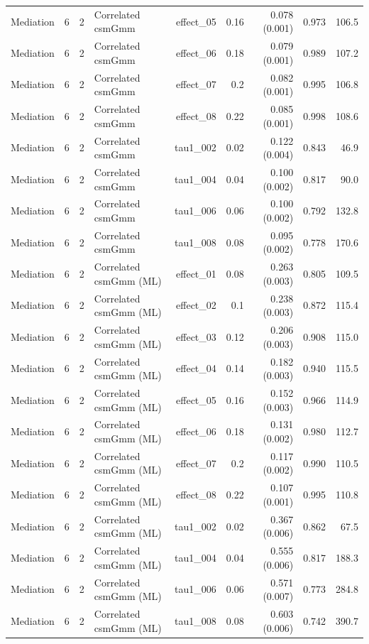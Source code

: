 \begin{longtable}{lcclrrrrr}
Mediation & 6 & 2 & Correlated csmGmm & effect\_05 & 0.16 & 0.078 (0.001) & 0.973 & 106.5\\
Mediation & 6 & 2 & Correlated csmGmm & effect\_06 & 0.18 & 0.079 (0.001) & 0.989 & 107.2\\
Mediation & 6 & 2 & Correlated csmGmm & effect\_07 & 0.2 & 0.082 (0.001) & 0.995 & 106.8\\
Mediation & 6 & 2 & Correlated csmGmm & effect\_08 & 0.22 & 0.085 (0.001) & 0.998 & 108.6\\
Mediation & 6 & 2 & Correlated csmGmm & tau1\_002 & 0.02 & 0.122 (0.004) & 0.843 & 46.9\\
Mediation & 6 & 2 & Correlated csmGmm & tau1\_004 & 0.04 & 0.100 (0.002) & 0.817 & 90.0\\
Mediation & 6 & 2 & Correlated csmGmm & tau1\_006 & 0.06 & 0.100 (0.002) & 0.792 & 132.8\\
Mediation & 6 & 2 & Correlated csmGmm & tau1\_008 & 0.08 & 0.095 (0.002) & 0.778 & 170.6\\
Mediation & 6 & 2 & Correlated csmGmm (ML) & effect\_01 & 0.08 & 0.263 (0.003) & 0.805 & 109.5\\
Mediation & 6 & 2 & Correlated csmGmm (ML) & effect\_02 & 0.1 & 0.238 (0.003) & 0.872 & 115.4\\
Mediation & 6 & 2 & Correlated csmGmm (ML) & effect\_03 & 0.12 & 0.206 (0.003) & 0.908 & 115.0\\
Mediation & 6 & 2 & Correlated csmGmm (ML) & effect\_04 & 0.14 & 0.182 (0.003) & 0.940 & 115.5\\
Mediation & 6 & 2 & Correlated csmGmm (ML) & effect\_05 & 0.16 & 0.152 (0.003) & 0.966 & 114.9\\
Mediation & 6 & 2 & Correlated csmGmm (ML) & effect\_06 & 0.18 & 0.131 (0.002) & 0.980 & 112.7\\
Mediation & 6 & 2 & Correlated csmGmm (ML) & effect\_07 & 0.2 & 0.117 (0.002) & 0.990 & 110.5\\
Mediation & 6 & 2 & Correlated csmGmm (ML) & effect\_08 & 0.22 & 0.107 (0.001) & 0.995 & 110.8\\
Mediation & 6 & 2 & Correlated csmGmm (ML) & tau1\_002 & 0.02 & 0.367 (0.006) & 0.862 & 67.5\\
Mediation & 6 & 2 & Correlated csmGmm (ML) & tau1\_004 & 0.04 & 0.555 (0.006) & 0.817 & 188.3\\
Mediation & 6 & 2 & Correlated csmGmm (ML) & tau1\_006 & 0.06 & 0.571 (0.007) & 0.773 & 284.8\\
Mediation & 6 & 2 & Correlated csmGmm (ML) & tau1\_008 & 0.08 & 0.603 (0.006) & 0.742 & 390.7\\

\end{longtable}
